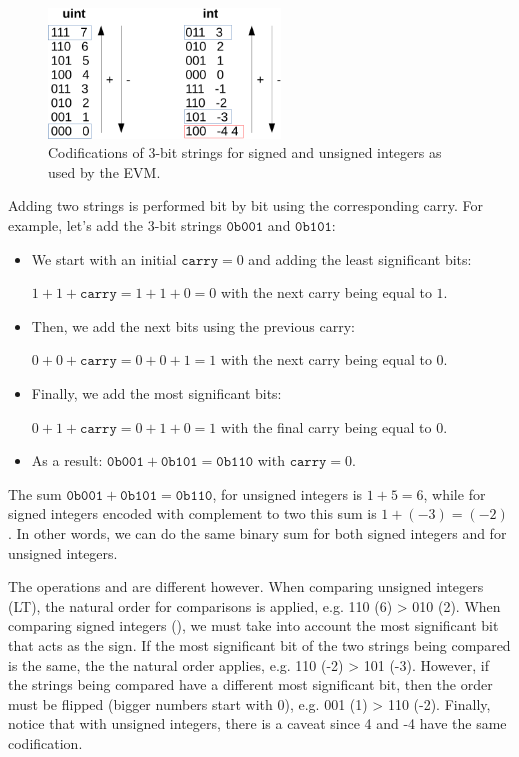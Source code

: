 \begin{figure}[h!]
    \centering
    \includegraphics[width=0.55\textwidth]{../figures/integers_complement_two}
    \caption{Codifications of 3-bit strings for signed and unsigned integers as used by the EVM. \label{fig:3-bit-strings}}
\end{figure}


Adding two strings is performed bit by bit using the corresponding carry. For example, let's add the 3-bit strings $\texttt{0b001}$ and $\texttt{0b101}$:

\begin{itemize}
    
    \item We start with an initial $\texttt{carry}=0$ and adding the least significant bits: 
    
    $1+1+\texttt{carry}=1+1+0=0$ with the next carry being equal to $1$.
    \item Then, we add the next bits using the previous carry: 
    
    $0+0+\texttt{carry} = 0+0+1 = 1$ with the next carry being equal to $0$.
    \item Finally, we add the most significant bits: 
    
    $0+1+\texttt{carry}=0+1+0=1$ with the final carry being equal to $0$.
    \item As a result: $\texttt{0b001} + \texttt{0b101} = \texttt{0b110}$ with $\texttt{carry}=0$.
    
\end{itemize}

The sum $\texttt{0b001} + \texttt{0b101} = \texttt{0b110}$, for unsigned integers is $1+5=6$, while for signed integers encoded with complement to two this sum is $1+(-3) =(-2)$. In other words, we can do the same binary sum for both signed integers and for unsigned integers.

The operations \LT and \SLT are different however. When comparing unsigned integers (LT), the natural order for comparisons is applied, e.g. 110 (6) > 010 (2). When comparing signed integers (\SLT), we must take into account the most significant bit that acts as the sign. If the most significant bit of the two strings being compared is the same, the the natural order applies, e.g. 110 (-2) > 101 (-3). However, if the strings being compared have a different most significant bit, then the order must be flipped (bigger numbers start with 0), e.g. 001 (1) > 110 (-2). Finally, notice that with unsigned integers, there is a caveat since 4 and -4 have the same codification.


